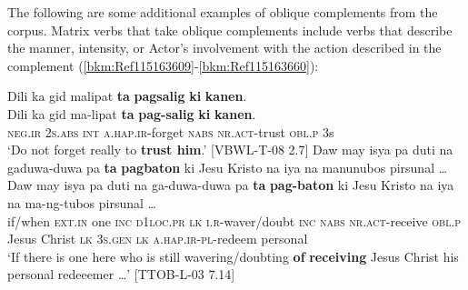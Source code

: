 The following are some additional examples of oblique complements from the corpus. Matrix verbs that take oblique complements include verbs that describe the manner, intensity, or Actor’s involvement with the action described in the complement (\ref{bkm:Ref115163609}-\ref{bkm:Ref115163660}):

\ea
\label{bkm:Ref115163609}
Dili  ka  gid  malipat  \textbf{ta}  \textbf{pagsalig}  \textbf{ki}  \textbf{kanen}. \smallskip\\
\gll Dili  ka  gid  ma-lipat  \textbf{ta}  \textbf{pag-salig}  \textbf{ki}  \textbf{kanen}\footnotemark{}. \\
\textsc{neg.ir}  2\textsc{s.abs}  \textsc{int}  \textsc{a.hap.ir}-forget  \textsc{nabs}  \textsc{nr.act}-trust  \textsc{obl.p}  3s \\
\glt ‘Do not forget really to \textbf{trust him}.’ [VBWL-T-08 2.7]
\z
\ea
Daw  may  isya  pa  duti  na  gaduwa-duwa  pa  \textbf{ta} \textbf{pagbaton}  ki  Jesu Kristo  na  iya  na  manunubos  pirsunal … \smallskip\\
\gll Daw  may  isya  pa  duti  na  ga-duwa-duwa  pa  \textbf{ta} \textbf{pag-baton}  ki  Jesu Kristo  na  iya  na  ma-ng-tubos  pirsunal … \\
if/when  \textsc{ext.in}  one  \textsc{inc}  \textsc{d}1\textsc{loc.pr}  \textsc{lk}  \textsc{i.r}-waver/doubt  \textsc{inc}  \textsc{nabs}
\textsc{nr.act}-receive  \textsc{obl.p}  Jesus Christ  \textsc{lk}  3\textsc{s.gen}  \textsc{lk}  \textsc{a.hap.ir-pl}-redeem  personal \\
\glt `If there is one here who is still wavering/doubting \textbf{of} \textbf{receiving} Jesus Christ his personal redeeemer …' [TTOB-L-03 7.14]
\z

\ea
    \z
\z

